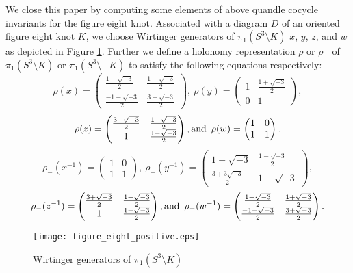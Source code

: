 \documentclass[12pt]{amsart}
\theoremstyle{definition}
\begin{document}
We close this paper by computing some elements of above quandle cocycle invariants for the figure eight knot.
Associated with a diagram $D$ of an oriented figure eight knot $K$, we choose Wirtinger generators of $\pi_{1}(S^{3} \setminus K)$ $x$, $y$, $z$, and $w$ as depicted in Figure \ref{fig:figure_eight}.
Further we define a holonomy representation $\rho$ or $\rho_{-}$ of $\pi_{1}(S^{3} \setminus K)$ or $\pi_{1}(S^{3} \setminus -K)$ to satisfy the following equations respectively:
\[
 \rho(x) = \begin{pmatrix} \frac{1 - \sqrt{-3}}{2} & \frac{1 + \sqrt{-3}}{2} \\ \frac{-1 - \sqrt{-3}}{2} & \frac{3 + \sqrt{-3}}{2} \end{pmatrix}, \
 \rho(y) = \begin{pmatrix} 1 & \frac{1 + \sqrt{-3}}{2} \\ 0 & 1 \end{pmatrix},
\]
\[
 \rho(z) = \begin{pmatrix} \frac{3 + \sqrt{-3}}{2} & \frac{1 - \sqrt{-3}}{2} \\ 1 & \frac{1 - \sqrt{-3}}{2} \end{pmatrix}, \mathrm{and} \enskip
 \rho(w) = \begin{pmatrix} 1 & 0 \\ 1 & 1 \end{pmatrix}.
\]
\[
 \rho_{-}(x^{-1}) = \begin{pmatrix} 1 & 0 \\ 1 & 1 \end{pmatrix}, \
 \rho_{-}(y^{-1}) = \begin{pmatrix} 1 + \sqrt{-3} & \frac{1 - \sqrt{-3}}{2} \\ \frac{3 + 3 \sqrt{-3}}{2} & 1 - \sqrt{-3} \end{pmatrix},
\]
\[
 \rho_{-}(z^{-1}) = \begin{pmatrix} \frac{3 + \sqrt{-3}}{2} & \frac{1 - \sqrt{-3}}{2} \\ 1 & \frac{1 - \sqrt{-3}}{2} \end{pmatrix}, \mathrm{and} \enskip
 \rho_{-}(w^{-1}) = \begin{pmatrix} \frac{1 - \sqrt{-3}}{2} & \frac{1 + \sqrt{-3}}{2} \\ \frac{-1 - \sqrt{-3}}{2} & \frac{3 + \sqrt{-3}}{2} \end{pmatrix}.
\]

\begin{figure}[htb]
\begin{center}
\texttt{[image: figure\_eight\_positive.eps]}
\end{center}
\caption{Wirtinger generators of $\pi_{1}(S^{3} \setminus K)$}
\label{fig:figure_eight}
\end{figure}
\end{document}
